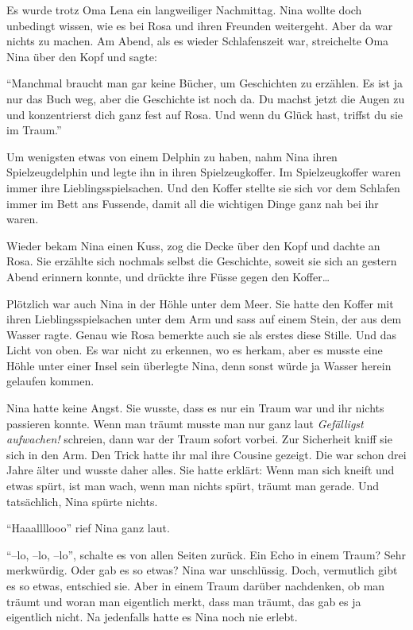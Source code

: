 Es wurde trotz Oma Lena ein langweiliger Nachmittag. Nina wollte doch unbedingt wissen, wie es bei Rosa und ihren Freunden weitergeht. Aber da war nichts zu machen. Am Abend, als es wieder Schlafenszeit war, streichelte Oma Nina über den Kopf und sagte:

\enquote{Manchmal braucht man gar keine Bücher, um Geschichten zu erzählen. Es ist ja nur das Buch weg, aber die Geschichte ist noch da. Du machst jetzt die Augen zu und konzentrierst dich ganz fest auf Rosa. Und wenn du Glück hast, triffst du sie im Traum.}

Um wenigsten etwas von einem Delphin zu haben, nahm Nina ihren Spielzeugdelphin und legte ihn in ihren Spielzeugkoffer. Im Spielzeugkoffer waren immer ihre Lieblingsspielsachen. Und den Koffer stellte sie sich vor dem Schlafen immer im Bett ans Fussende, damit all die wichtigen Dinge ganz nah bei ihr waren.

Wieder bekam Nina einen Kuss, zog die Decke über den Kopf und dachte an Rosa. Sie erzählte sich nochmals selbst die Geschichte, soweit sie sich an gestern Abend erinnern konnte, und drückte ihre Füsse gegen den Koffer\dots

\vspace{10pt}
 \centerline{\Huge \Dolphin[red]}
\vspace{10pt}

Plötzlich war auch Nina in der Höhle unter dem Meer. Sie hatte den Koffer mit ihren Lieblingsspielsachen unter dem Arm und sass auf einem Stein, der aus dem Wasser ragte. Genau wie Rosa bemerkte auch sie als erstes diese Stille. Und das Licht von oben. Es war nicht zu erkennen, wo es herkam, aber es musste eine Höhle unter einer Insel sein überlegte Nina, denn sonst würde ja Wasser herein gelaufen kommen.

Nina hatte keine Angst. Sie wusste, dass es nur ein Traum war und ihr nichts passieren konnte. Wenn man träumt musste man nur ganz laut {\it Gefälligst aufwachen!} schreien, dann war der Traum sofort vorbei. Zur Sicherheit kniff sie sich in den Arm. Den Trick hatte ihr mal ihre Cousine gezeigt. Die war schon drei Jahre älter und wusste daher alles. Sie hatte erklärt: Wenn man sich kneift und etwas spürt, ist man wach, wenn man nichts spürt, träumt man gerade. Und tatsächlich, Nina spürte nichts.

\enquote{Haaallllooo} rief Nina ganz laut.

\enquote{--lo, --lo, --lo}, schalte es von allen Seiten zurück. Ein Echo in einem Traum? Sehr merkwürdig. Oder gab es so etwas? Nina war unschlüssig. Doch, vermutlich gibt es so etwas, entschied sie. Aber in einem Traum darüber nachdenken, ob man träumt und woran man eigentlich merkt, dass man träumt, das gab es ja eigentlich nicht. Na jedenfalls hatte es Nina noch nie erlebt.


